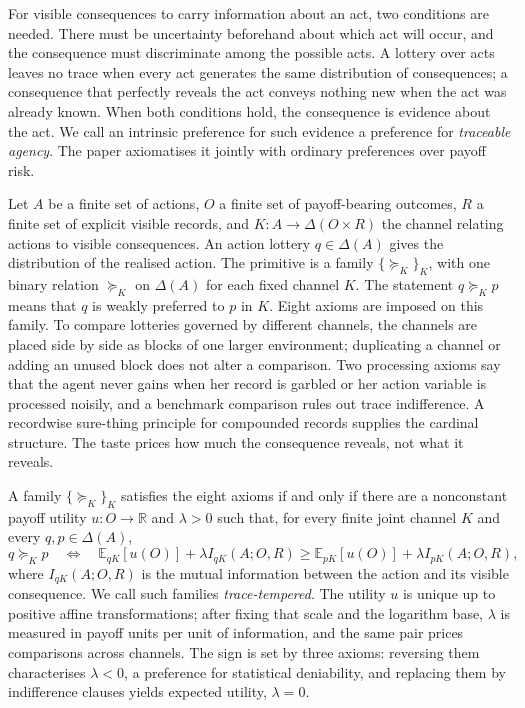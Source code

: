\documentclass[11pt,a4paper]{article}
\theoremstyle{definition}
\newcommand{\E}{\mathbb E}
\newcommand{\1}{\mathbf 1}
\begin{document}
For visible consequences to carry information about an act, two conditions are needed.  There must be uncertainty
beforehand about which act will occur, and the consequence must discriminate among the
possible acts.  A lottery over acts leaves no trace when every act generates the same distribution of
consequences; a consequence that perfectly reveals the act conveys nothing new when the act was already
known.  When both conditions hold, the consequence is evidence about the act.  We call an intrinsic
preference for such evidence a preference for \emph{traceable agency}.  The paper axiomatises it jointly
with ordinary preferences over payoff risk.

Let $A$ be a finite set of actions, $O$ a finite set of payoff-bearing
outcomes, $R$ a finite set of explicit visible records, and $K:A\to\Delta(O\times R)$ the channel relating actions to
visible consequences.  An action lottery $q\in\Delta(A)$ gives the distribution of the realised action.  The primitive is a family
$\{\succeq_K\}_K$, with one binary relation $\succeq_K$ on $\Delta(A)$ for each fixed channel $K$.
The statement $q\succeq_Kp$ means that $q$ is weakly preferred to $p$ in $K$.  Eight axioms are
imposed on this family.  To compare lotteries governed
by different channels, the channels are placed side by side as blocks of one larger environment; duplicating a
channel or adding an unused block does not alter a comparison.  Two processing axioms say that the agent never gains when her record is garbled or her action variable is processed noisily, and a benchmark comparison rules out trace indifference. A recordwise sure-thing principle for compounded records supplies
the cardinal structure.  The taste prices how much the consequence reveals, not what it reveals.

A family $\{\succeq_K\}_K$ satisfies the eight axioms if and
only if there are a nonconstant payoff utility $u:O\to\mathbb R$ and $\lambda>0$ such that, for every finite joint
channel $K$ and every $q,p\in\Delta(A)$,
\[
 q\succeq_Kp
 \quad\Longleftrightarrow\quad
 \E_{qK}[u(O)]+\lambda I_{qK}(A;O,R)
 \ge
 \E_{pK}[u(O)]+\lambda I_{pK}(A;O,R),
\]
where $I_{qK}(A;O,R)$ is the mutual information between the action and its visible consequence.  We call such
families \emph{trace-tempered}.  The utility $u$ is unique up to positive affine transformations; after fixing that
scale and the logarithm base, $\lambda$ is measured in payoff units per unit of information, and the same pair prices comparisons across channels.  The sign is set by three axioms: reversing them characterises $\lambda<0$, a preference for statistical
deniability, and replacing them by indifference clauses yields expected utility, $\lambda=0$. 
\end{document}
